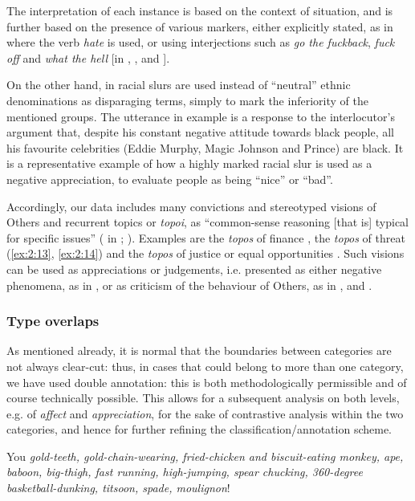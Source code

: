 \documentclass[output=paper]{LSP/langsci}
\begin{document}
The interpretation of each instance is based on the context of situation, and is further based on the presence of various markers, either explicitly stated, as in  where the verb \textit{hate} is used, or using interjections such as \textit{go the fuckback}, \textit{fuck off} and \textit{what the hell} [in , , and ].

On the other hand, in  racial slurs are used instead of “neutral” ethnic denominations as disparaging terms, simply to mark the inferiority of the mentioned groups. The utterance in example  is a response to the interlocutor's argument that, despite his constant negative attitude towards black people, all his favourite celebrities (Eddie Murphy, Magic Johnson and Prince) are black. It is a representative example of how a highly marked racial slur is used as a negative appreciation, to evaluate people as being “nice” or “bad”.

Accordingly, our data includes many convictions and stereotyped visions of Others  and recurrent topics or \textit{topoi}, as “common-sense reasoning [that is] typical for specific issues” (\citealt{Dijk2000c} in \citealt[299, note 21]{BakerGabrielatos2008}; \citealt[see also][74–76]{Reisigl2001}). Examples are the \textit{topos} of finance , the \textit{topos} of threat (\ref{ex:2:13}, \ref{ex:2:14}) and the \textit{topos} of justice or equal opportunities . Such visions can be used as appreciations or judgements, i.e. presented as either negative phenomena, as in , or as criticism of the behaviour of Others, as in ,  and .


\subsubsection{Type overlaps}

As mentioned already, it is normal that the boundaries between categories are not always clear-cut: thus, in cases that could belong to more than one category, we have used double annotation: this is both methodologically permissible and of course technically possible. This allows for a subsequent analysis on both levels, e.g. of \textit{affect} and \textit{appreciation}, for the sake of contrastive analysis within the two categories, and hence for further refining the classification/annotation scheme.\newline

\ea \label{ex:2:17} You \emph{gold-teeth, gold-chain-wearing, fried-chicken and biscuit-eating monkey, ape, baboon, big-thigh, fast running, high-jumping, spear chucking, 360-degree basketball-dunking, titsoon, spade, moulignon}!
\z
\end{document}
